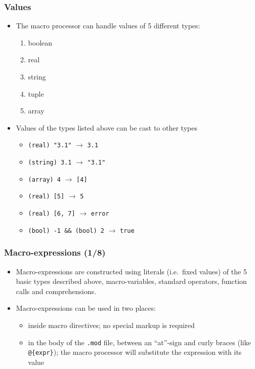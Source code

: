 \documentclass[aspectratio=169]{beamer}
\begin{document}
\begin{frame}
\frametitle{Values}
\begin{itemize}
\item The macro processor can handle values of 5 different types:
  \begin{enumerate}
  \item boolean
  \item real
  \item string
  \item tuple
  \item array
  \end{enumerate}
\item Values of the types listed above can be cast to other types
  \begin{itemize}
  \item \texttt{(real) "3.1"} $\rightarrow$ \texttt{3.1}
  \item \texttt{(string) 3.1} $\rightarrow$ \texttt{"3.1"}
  \item \texttt{(array) 4} $\rightarrow$ \texttt{[4]}
  \item \texttt{(real) [5]} $\rightarrow$ \texttt{5}
  \item \texttt{(real) [6, 7]} $\rightarrow$ \texttt{error}
  \item \texttt{(bool) -1 \&\& (bool) 2} $\rightarrow$ \texttt{true}
  \end{itemize}
\end{itemize}
\end{frame}

\begin{frame}[fragile=singleslide]
  \frametitle{Macro-expressions (1/8)}
  \begin{itemize}
    \item Macro-expressions are constructed using literals (i.e.\ fixed values) of the 5 basic types
      described above, macro-variables, standard operators, function calls and comprehensions.
    \item Macro-expressions can be used in two places:
      \begin{itemize}
      \item inside macro directives; no special markup is required
      \item in the body of the \texttt{.mod} file, between an ``at''-sign and curly braces (like \verb+@{expr}+); the macro processor will substitute the expression with its value
      \end{itemize}
  \end{itemize}
\end{frame}
\end{document}
